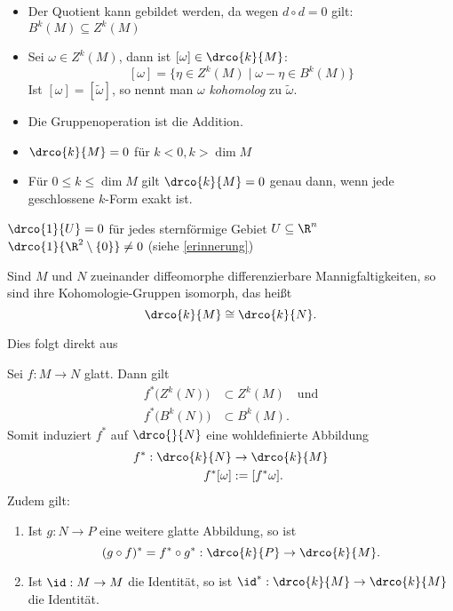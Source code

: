 \begin{rem*}
	\begin{itemize}
		\item Der Quotient kann gebildet werden, da wegen $d \circ d = 0$ gilt: $B^k(M) \subseteq Z^k(M)$
		\item Sei $\omega \in Z^k(M)$, dann ist $[\omega] \in \drco{k}{M}$:
			\[ [\omega] = \{ \eta \in Z^k(M) \mid \omega - \eta \in B^k(M) \} \]
			Ist $[\omega] = [\tilde{\omega}]$, so nennt man $\omega$ \emph{kohomolog} zu $\tilde{\omega}$.
		\item Die Gruppenoperation ist die Addition.
		\item $ \drco{k}{M} = 0 $ für $k<0, k > \dim M$
		\item Für $ 0 \leq k \leq \dim M $ gilt $ \drco{k}{M} = 0 $ genau dann, wenn jede geschlossene $k$-Form exakt ist.
	\end{itemize}
\end{rem*}

\begin{exmp*}
	$ \drco{1}{U} = 0 $ für jedes sternförmige Gebiet $U \subseteq \R^n$\\
	$ \drco{1}{\R^2 \setminus \{0\}} \neq 0 $ (siehe \ref{erinnerung})
\end{exmp*}

\begin{lem}\label{7.14}
	Sind $M$ und $N$ zueinander diffeomorphe differenzierbare Mannigfaltigkeiten, so sind ihre Kohomologie-Gruppen isomorph, das heißt
	\[ \drco{k}{M} \cong \drco{k}{N}. \]
\end{lem}

\noindent Dies folgt direkt aus

\begin{lem}
	Sei $ f: M \to N $ glatt. Dann gilt
	\begin{align*}
		f^*\big(Z^k(N)\big) &\subset Z^k(M) \quad \text{und}\\
		f^*\big(B^k(N)\big) &\subset B^k(M).
	\end{align*}
	Somit induziert $f^*$ auf $\drco{}{N}$ eine wohldefinierte Abbildung
	\begin{align*}
		f^*: \drco{k}{N} &\to \drco{k}{M}\\
		f^*[\omega] &:= [f^*\omega].
	\end{align*}
	Zudem gilt:
	\begin{enumerate}[label={\roman*})]
		\item Ist $g: N \to P$ eine weitere glatte Abbildung, so ist
			\[ (g \circ f)^* = f^* \circ g^*: \drco{k}{P} \to \drco{k}{M}. \]
		\item Ist $\id: M \to M$ die Identität, so ist $ \id^*: \drco{k}{M} \to \drco{k}{M} $ die Identität.
	\end{enumerate}
\end{lem}

